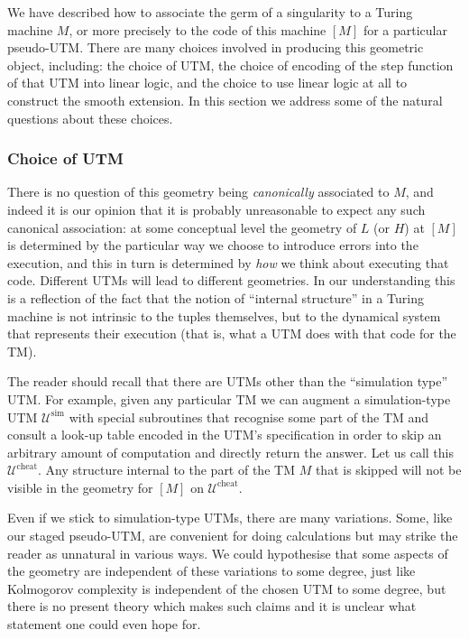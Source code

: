 \documentclass[english,letter paper,12pt,reqno]{article}
\theoremstyle{definition}
\begin{document}
We have described how to associate the germ of a singularity to a Turing machine $M$, or more precisely to the code of this machine $[M]$ for a particular pseudo-UTM. There are many choices involved in producing this geometric object, including: the choice of UTM, the choice of encoding of the step function of that UTM into linear logic, and the choice to use linear logic at all to construct the smooth extension. In this section we address some of the natural questions about these choices.

\subsubsection{Choice of UTM}

There is no question of this geometry being \emph{canonically} associated to $M$, and indeed it is our opinion that it is probably unreasonable to expect any such canonical association: at some conceptual level the geometry of $L$ (or $H$) at $[M]$ is determined by the particular way we choose to introduce errors into the execution, and this in turn is determined by \emph{how} we think about executing that code. Different UTMs will lead to different geometries. In our understanding this is a reflection of the fact that the notion of ``internal structure'' in a Turing machine is not intrinsic to the tuples themselves, but to the dynamical system that represents their execution (that is, what a UTM does with that code for the TM).

The reader should recall that there are UTMs other than the ``simulation type'' UTM. For example, given any particular TM we can augment a simulation-type UTM $\mathcal{U}^{\text{sim}}$ with special subroutines that recognise some part of the TM and consult a look-up table encoded in the UTM's specification in order to skip an arbitrary amount of computation and directly return the answer. Let us call this $\mathcal{U}^{\text{cheat}}$. Any structure internal to the part of the TM $M$ that is skipped will not be visible in the geometry for $[M]$ on $\mathcal{U}^{\text{cheat}}$.

Even if we stick to simulation-type UTMs, there are many variations. Some, like our staged pseudo-UTM, are convenient for doing calculations but may strike the reader as unnatural in various ways. We could hypothesise that some aspects of the geometry are independent of these variations to some degree, just like Kolmogorov complexity is independent of the chosen UTM to some degree, but there is no present theory which makes such claims and it is unclear what statement one could even hope for.
\end{document}
